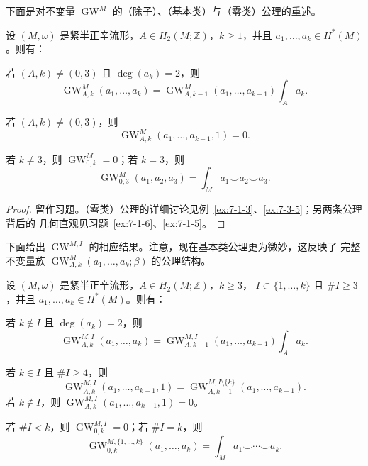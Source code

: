下面是对不变量 $\operatorname{GW}^M$ 的（除子）、（基本类）与（零类）公理的重述。

\begin{proposition}\label{prop:7-5-6}
设 $(M,\omega)$ 是紧半正辛流形，$A\in H_2(M;\mathbb Z)$，$k\ge1$，并且
$a_1,\ldots,a_k\in H^*(M)$。则有：
\begin{description}[leftmargin=2em,style=nextline]
\item[（除子）] 若 $(A,k)\ne(0,3)$ 且 $\deg(a_k)=2$，则
\[
  \operatorname{GW}_{A,k}^M(a_1,\ldots,a_k)
  =\operatorname{GW}_{A,k-1}^M(a_1,\ldots,a_{k-1})\int_Aa_k.
\]
\item[（基本类）] 若 $(A,k)\ne(0,3)$，则
\[
  \operatorname{GW}_{A,k}^M(a_1,\ldots,a_{k-1},1)=0.
\]
\item[（零类）] 若 $k\ne3$，则 $\operatorname{GW}_{0,k}^M=0$；若 $k=3$，则
\[
  \operatorname{GW}_{0,3}^M(a_1,a_2,a_3)
  =\int_Ma_1\smile a_2\smile a_3.
\]
\end{description}
\end{proposition}

\begin{proof}
留作习题。（零类）公理的详细讨论见例~\ref{ex:7-1-3}、\ref{ex:7-3-5}；另两条公理背后的
几何直观见习题~\ref{ex:7-1-6}、\ref{ex:7-1-5}。
\end{proof}

下面给出 $\operatorname{GW}^{M,I}$ 的相应结果。注意，现在基本类公理更为微妙，这反映了
完整不变量族 $\operatorname{GW}_{A,k}^M(a_1,\ldots,a_k;\beta)$ 的公理结构。

\begin{proposition}\label{prop:7-5-7}
设 $(M,\omega)$ 是紧半正辛流形，$A\in H_2(M;\mathbb Z)$，$k\ge3$，
$I\subset\{1,\ldots,k\}$ 且 $\#I\ge3$，并且 $a_1,\ldots,a_k\in H^*(M)$。则有：
\begin{description}[leftmargin=2em,style=nextline]
\item[（除子）] 若 $k\notin I$ 且 $\deg(a_k)=2$，则
\[
  \operatorname{GW}_{A,k}^{M,I}(a_1,\ldots,a_k)
  =\operatorname{GW}_{A,k-1}^{M,I}(a_1,\ldots,a_{k-1})\int_Aa_k.
\]
\item[（基本类）] 若 $k\in I$ 且 $\#I\ge4$，则
\[
  \operatorname{GW}_{A,k}^{M,I}(a_1,\ldots,a_{k-1},1)
  =\operatorname{GW}_{A,k-1}^{M,I\setminus\{k\}}(a_1,\ldots,a_{k-1}).
\]
若 $k\notin I$，则
$\operatorname{GW}_{A,k}^{M,I}(a_1,\ldots,a_{k-1},1)=0$。
\item[（零类）] 若 $\#I<k$，则 $\operatorname{GW}_{0,k}^{M,I}=0$；若 $\#I=k$，则
\[
  \operatorname{GW}_{0,k}^{M,\{1,\ldots,k\}}(a_1,\ldots,a_k)
  =\int_Ma_1\smile\cdots\smile a_k.
\]
\end{description}
\end{proposition}

